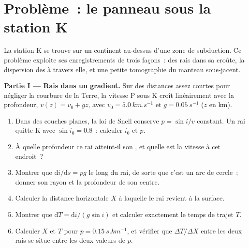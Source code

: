 \section{Problème~: le panneau sous la station K}

\begin{problem}
\label{pb:b3:seismology-imaging:1}
La station K se trouve sur un continent au-dessus d'une zone de subduction. Ce problème exploite ses
enregistrements de trois façons~: des rais dans sa croûte, la dispersion des  à travers elle,
et une petite tomographie du manteau sous-jacent.

\medskip
\noindent\textbf{Partie I --- Rais dans un gradient.} Sur des distances assez courtes pour
négliger la courbure de la Terre, la vitesse P sous K croît linéairement avec la profondeur,
$v(z) = v_0 + gz$, avec $v_0 = \qty{5.0}{km.s^{-1}}$ et
$g = \qty{0.05}{s^{-1}}$ ($z$ en km).
\begin{enumerate}
  \item Dans des couches planes, la loi de Snell conserve $p = \sin i/v$ constant. Un rai quitte
        K avec $\sin i_0 = 0.8$~: calculer $i_0$ et $p$.
  \item À quelle profondeur ce rai atteint-il son , et quelle est la vitesse à cet endroit~?
       \item Montrer que $\mathrm di/\mathrm ds = pg$ le long du rai, de sorte que c'est un
        arc de cercle~; donner son rayon et la profondeur de son centre.
  \item Calculer la distance horizontale $X$ à laquelle le rai revient à la
        surface.
  \item Montrer que $\mathrm dT = \mathrm di/(g\sin i)$ et calculer exactement le temps de
        trajet $T$.
  \item Calculer $X$ et $T$ pour $p = \qty{0.15}{s.km^{-1}}$, et vérifier que
        $\Delta T/\Delta X$ entre les deux rais se situe entre les deux valeurs
        de $p$.
\end{enumerate}


\end{problem}
